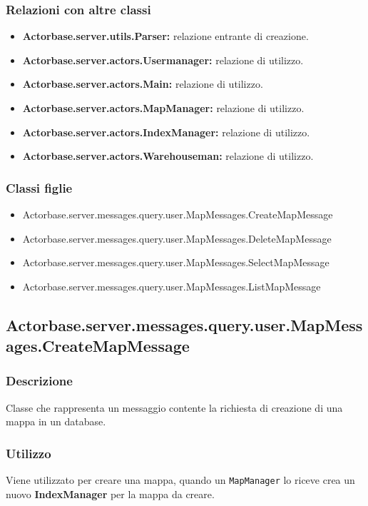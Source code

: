 \documentclass[a4paper]{article}
\begin{document}
			\subsubsection{Relazioni con altre classi}
				\begin{itemize}
					\item \textbf{Actorbase.server.utils.Parser:} relazione entrante di creazione.
					\item \textbf{Actorbase.server.actors.Usermanager:} relazione di utilizzo.
					\item \textbf{Actorbase.server.actors.Main:} relazione di utilizzo.
					\item \textbf{Actorbase.server.actors.MapManager:} relazione di utilizzo.
					\item \textbf{Actorbase.server.actors.IndexManager:} relazione di utilizzo.
					\item \textbf{Actorbase.server.actors.Warehouseman:} relazione di utilizzo.
				\end{itemize}
				
			\subsubsection{Classi figlie}
				\begin{itemize}
					\item Actorbase.server.messages.query.user.MapMessages.CreateMapMessage
					\item Actorbase.server.messages.query.user.MapMessages.DeleteMapMessage
					\item Actorbase.server.messages.query.user.MapMessages.SelectMapMessage
					\item Actorbase.server.messages.query.user.MapMessages.ListMapMessage
				\end{itemize}
				
		\subsection{Actorbase.server.messages.query.user.MapMessages.CreateMapMessage}
			\subsubsection{Descrizione}
				Classe che rappresenta un messaggio contente la richiesta di creazione di una mappa in un database.
				
			\subsubsection{Utilizzo}
				Viene utilizzato per creare una mappa, quando un \texttt{MapManager} lo riceve crea un nuovo \textbf{IndexManager} per la mappa da creare.
				
\end{document}
